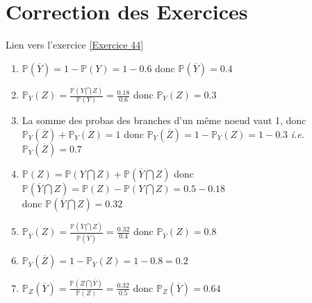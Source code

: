 \documentclass[12pt,fleqn]{report} %
\begin{document}
\chapter{Correction des Exercices}
\begin{correction}Lien vers l'exercice   \ref{Exercice 44}
	\begin{enumerate}
		\item{$\mathbb{P}(\overline{Y})=1-\mathbb{P}(Y)=1-0.6$ donc $\mathbb{P}(\overline{Y})=0.4$}
		\vskip 0.35cm
		\item{$\mathbb{P}_Y(Z)=\frac{\mathbb{P}(Y\bigcap Z)}{\mathbb{P}(Y)}=\frac{0.18}{0.6}$ donc $\mathbb{P}_Y(Z)=0.3$}
		\vskip 0.35cm
		\item{La somme des probas des branches d'un même noeud vaut 1, donc $\mathbb{P}_Y(\overline{Z})+\mathbb{P}_Y(Z)=1$ donc $\mathbb{P}_Y(\overline{Z})=1-\mathbb{P}_Y(Z)=1-0.3$ \emph{i.e.} $\mathbb{P}_Y(\overline{Z})=0.7$}
		\vskip 0.35cm
		\item{$\mathbb{P}(Z)=\mathbb{P}(Y\bigcap Z)+\mathbb{P}(\overline{Y}\bigcap Z)$ donc $\mathbb{P}(\overline{Y}\bigcap Z)=\mathbb{P}(Z)-\mathbb{P}(Y\bigcap Z)=0.5-0.18$ \\ donc $\mathbb{P}(\overline{Y}\bigcap Z)=0.32$}
		\vskip 0.35cm
		\item{$\mathbb{P}_{\overline Y}(Z)=\frac{\mathbb{P}(\overline{Y}\bigcap Z)}{\mathbb{P}(\overline{Y})}=\frac{0.32}{0.4}$ donc $\mathbb{P}_{\overline Y}(Z)=0.8$}
		\vskip 0.35cm
		\item{$\mathbb{P}_{\overline Y}(\overline{Z})=1-\mathbb{P}_{\overline Y}(Z)=1-0.8=0.2$}
		\vskip 0.35cm
		\item{$\mathbb{P}_Z(\overline{Y})=\frac{\mathbb{P}(Z\bigcap \overline{Y})}{\mathbb{P}(Z)}=\frac{0.32}{0.5}$ donc $\mathbb{P}_Z(\overline{Y})=0.64$}
	\end{enumerate} 
\end{correction}
\end{document}
